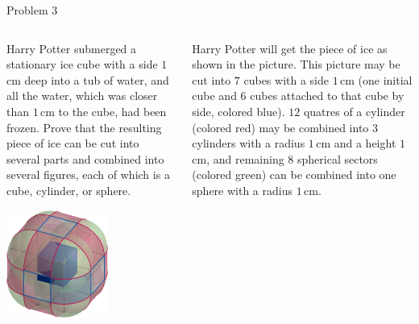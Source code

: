 \documentclass[9pt,aspectratio=169]{beamer}
\begin{document}
\begin{frame}{Problem 3}
  \begin{columns}[T]
    \begin{column}{0.5\textwidth}
      \begin{problem}
        Harry Potter submerged a stationary ice cube with a side $1$\,cm deep into a tub of water, and all the water, which was closer than $1$\,cm to the cube, had been frozen. Prove that the resulting piece of ice can be cut into several parts and combined into several figures, each of which is a cube, cylinder, or sphere.
      \end{problem}
      \begin{center}
        \includegraphics[width=0.6\textwidth]{Kvantik/Harry Potter.png}
      \end{center}
    \end{column}
    \begin{column}{0.5\textwidth}
      Harry Potter will get the piece of ice as shown in the picture. This picture may be cut into $7$ cubes with a side $1$\,cm (one initial cube and $6$ cubes attached to that cube by side, colored blue). $12$ quatres of a cylinder (colored red) may be combined into $3$ cylinders with a radius $1$\,cm and a height $1$\,cm, and remaining $8$ spherical sectors (colored green) can be combined into one sphere with a radius $1$\,cm.
    \end{column}
  \end{columns}
\end{frame}
\end{document}
